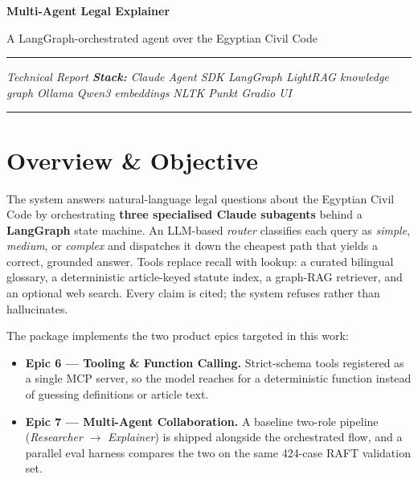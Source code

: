 \documentclass[10pt,a4paper]{article}
\begin{document}
\begingroup
\setlength{\parindent}{0pt}
{\Huge\bfseries\color{nileblue} Multi-Agent Legal Explainer\par}
\vspace{2pt}
{\large\color{nilegray} A LangGraph-orchestrated agent over the Egyptian Civil Code\par}
\vspace{6pt}
\textcolor{ruleline}{\rule{\linewidth}{0.6pt}}\par\vspace{4pt}
{\small\color{nilegray}\itshape Technical Report \quad\textbullet\quad \textbf{Stack:} Claude Agent SDK \textbullet{} LangGraph \textbullet{} LightRAG knowledge graph \textbullet{} Ollama Qwen3 embeddings \textbullet{} NLTK Punkt \textbullet{} Gradio UI\par}
\textcolor{ruleline}{\rule{\linewidth}{0.6pt}}
\endgroup

\vspace{6pt}

\section{Overview \& Objective}

The system answers natural-language legal questions about the Egyptian Civil Code by orchestrating \textbf{three specialised Claude subagents} behind a \textbf{LangGraph} state machine. An LLM-based \textit{router} classifies each query as \emph{simple}, \emph{medium}, or \emph{complex} and dispatches it down the cheapest path that yields a correct, grounded answer. Tools replace recall with lookup: a curated bilingual glossary, a deterministic article-keyed statute index, a graph-RAG retriever, and an optional web search. Every claim is cited; the system refuses rather than hallucinates.

The package implements the two product epics targeted in this work:
\begin{itemize}
\item \textbf{Epic 6 — Tooling \& Function Calling.} Strict-schema tools registered as a single MCP server, so the model reaches for a deterministic function instead of guessing definitions or article text.
\item \textbf{Epic 7 — Multi-Agent Collaboration.} A baseline two-role pipeline (\emph{Researcher} \(\rightarrow\) \emph{Explainer}) is shipped alongside the orchestrated flow, and a parallel eval harness compares the two on the same 424-case RAFT validation set.
\end{itemize}
\end{document}
